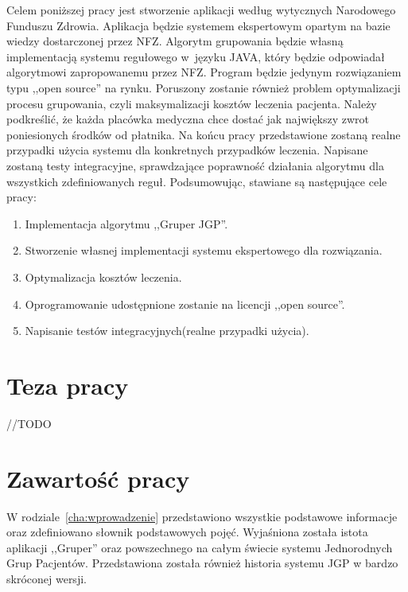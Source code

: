 Celem poniższej pracy jest stworzenie aplikacji według wytycznych Narodowego Funduszu Zdrowia\cite{plik_parametryzujacy}\cite{algorytm_grupera}. Aplikacja będzie systemem ekspertowym opartym na bazie wiedzy dostarczonej przez NFZ\cite{plik_parametryzujacy}. Algorytm grupowania będzie własną implementacją systemu regułowego w~języku JAVA, który będzie odpowiadał algorytmowi zapropowanemu przez NFZ\cite{algorytm_grupera}. Program będzie jedynym rozwiązaniem typu ,,open source'' na rynku. Poruszony zostanie również problem optymalizacji procesu grupowania, czyli maksymalizacji kosztów leczenia pacjenta. Należy podkreślić, że każda placówka medyczna chce dostać jak największy zwrot poniesionych środków od płatnika. Na końcu pracy przedstawione zostaną realne przypadki użycia systemu dla konkretnych przypadków leczenia. Napisane zostaną testy integracyjne, sprawdzające poprawność działania algorytmu dla wszystkich zdefiniowanych reguł. 
Podsumowując, stawiane są następujące cele pracy:
\begin{enumerate}
\item Implementacja algorytmu ,,Gruper JGP''.
\item Stworzenie własnej implementacji systemu ekspertowego dla rozwiązania.
\item Optymalizacja kosztów leczenia.
\item Oprogramowanie udostępnione zostanie na licencji ,,open source''.
\item Napisanie testów integracyjnych(realne przypadki użycia).
\end{enumerate}



\section{Teza pracy}
\label{sec:tezaPracy}
//TODO


\section{Zawartość pracy}
\label{sec:zawartoscPracy}

W rodziale~\ref{cha:wprowadzenie} przedstawiono wszystkie podstawowe informacje oraz zdefiniowano słownik podstawowych pojęć. Wyjaśniona została istota aplikacji ,,Gruper'' oraz powszechnego na całym świecie systemu Jednorodnych Grup Pacjentów. Przedstawiona została również historia systemu JGP w bardzo skróconej wersji.

